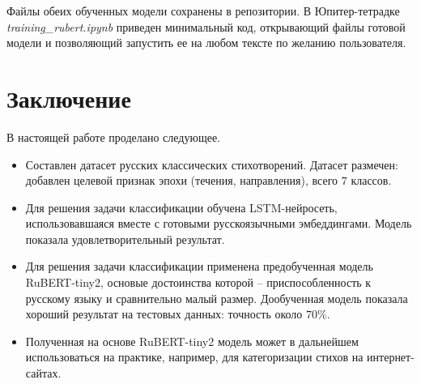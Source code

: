 \documentclass[a4paper,12pt]{article}
\begin{document}
Файлы обеих обученных модели сохранены в репозитории. В Юпитер-тетрадке \textit{training\_rubert.ipynb} приведен минимальный код, открывающий файлы готовой модели и позволяющий запустить ее на любом тексте по желанию пользователя.


\section{Заключение}
В настоящей работе проделано следующее.
\begin{itemize}
    \item Составлен датасет русских классических стихотворений. Датасет размечен: добавлен целевой признак эпохи (течения, направления), всего $7$ классов.
    \item Для решения задачи классификации обучена LSTM-нейросеть, использовавшаяся вместе с готовыми русскоязычными эмбеддингами. Модель показала удовлетворительный результат.
    \item Для решения задачи классификации применена предобученная модель RuBERT-tiny2, основые достоинства которой -- приспособленность к русскому языку и сравнительно малый размер. Дообученная модель показала хороший результат на тестовых данных: точность около $70 \%$.
    \item Полученная на основе RuBERT-tiny2 модель может в дальнейшем использоваться на практике, например, для категоризации стихов на интернет-сайтах.
\end{itemize}


\begin{otherlanguage}{english}
\printbibliography[
    heading=bibintoc
]
\end{otherlanguage}
\end{document}
